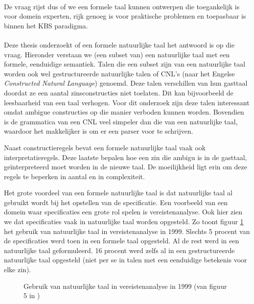 \paragraph{} De vraag rijst dus of we een formele taal kunnen ontwerpen die toegankelijk is voor domein experten, rijk genoeg is voor praktische problemen en toepasbaar is binnen het KBS paradigma.

\paragraph{} Deze thesis onderzoekt of een formele natuurlijke taal het antwoord is op die vraag. Hieronder verstaan we (een subset van) een natuurlijke taal met een formele, eenduidige semantiek. Talen die een subset zijn van een natuurlijke taal worden ook wel gestructureerde natuurlijke talen of CNL's (naar het Engelse \textit{Constructed Natural Language}) genoemd. Deze talen verschillen van hun gasttaal doordat ze een aantal zinsconstructies niet toelaten. Dit kan bijvoorbeeld de leesbaarheid van een taal verhogen. Voor dit onderzoek zijn deze talen interessant omdat ambigue constructies op die manier verboden kunnen worden. Bovendien is de grammatica van een CNL veel simpeler dan die van een natuurlijke taal, waardoor het makkelijker is om er een parser voor te schrijven.

Naast constructieregels bevat een formele natuurlijke taal vaak ook interpretatieregels. Deze laatste bepalen hoe een zin die ambigu is in de gasttaal, geïnterpreteerd moet worden in de nieuwe taal. De moeilijkheid ligt erin om deze regels te beperken in aantal en in complexiteit.

Het grote voordeel van een formele natuurlijke taal is dat natuurlijke taal al gebruikt wordt bij het opstellen van de specificatie. Een voorbeeld van een domein waar specificaties een grote rol spelen is vereistenanalyse. Ook hier zien we dat specificaties vaak in natuurlijke taal worden opgesteld. Zo toont figuur \ref{fig:natural-language-use} het gebruik van natuurlijke taal in vereistenanalyse in 1999. Slechts 5 procent van de specificaties werd toen in een formele taal opgesteld. Al de rest werd in een natuurlijke taal geformuleerd. 16 procent werd zelfs al in een gestructureerde natuurlijke taal opgesteld (niet per se in talen met een eenduidige betekenis voor elke zin).

\begin{figure}
  \label{fig:natural-language-use}
  \caption{Gebruik van natuurlijke taal in vereistenanalyse in 1999 (van figuur 5 in \cite{Luisa2004})}
\end{figure}
